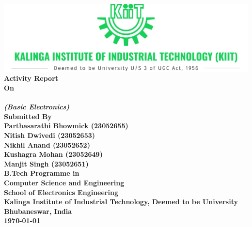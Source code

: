 \begin{titlepage}
    \vspace*{\fill}
    \begin{center}
    \textbf{\large
        \includegraphics[width=\textwidth]{images/KIIT-Full-Logo-Center.png} \\
        \vspace*{\baselineskip}\vspace*{\baselineskip}
        Activity Report \\ On \\ \\
        \medskip
        \textit{(Basic Electronics)} \\
        \vspace*{\baselineskip}\vspace*{\baselineskip}
        Submitted By \\ \smallskip
        Parthasarathi Bhowmick (23052655) \\ Nitish Dwivedi (23052653) \\ Nikhil Anand (23052652) \\ Kushagra Mohan (23052649) \\ Manjit Singh (23052651) \\
        \vspace*{\baselineskip}\vspace*{\baselineskip} 
        B.Tech Programme in \\ Computer Science and Engineering \\
        \vspace*{\baselineskip}
        School of Electronics Engineering \\
        Kalinga Institute of Industrial Technology, Deemed to be University \\
        Bhubaneswar, India \\
        \vspace*{\baselineskip}
        \monthyear\today
    }
    \end{center}
    \vspace*{\fill}
\end{titlepage}
\clearpage
\restoregeometry